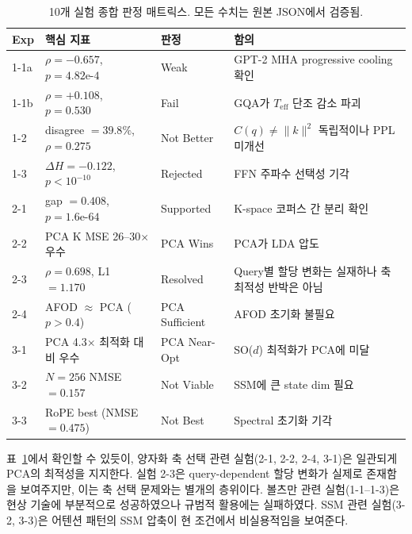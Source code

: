 \documentclass[11pt,a4paper]{article}
\newcommand{\teff}{T_\mathrm{eff}}
\newcommand{\Cq}{C(q)}
\newcommand{\knorm}{\|k\|^2}
\begin{document}
\begin{table}[H]
\centering
\caption{10개 실험 종합 판정 매트릭스. 모든 수치는 원본 JSON에서 검증됨.}
\label{tab:verdict}
\small
\begin{tabularx}{\textwidth}{@{}l>{\raggedright\arraybackslash}p{3.8cm}l>{\raggedright\arraybackslash}X@{}}
\toprule
\textbf{Exp} & \textbf{핵심 지표} & \textbf{판정} & \textbf{함의} \\
\midrule
1-1a & $\rho = -0.657$, $p = 4.82\text{e-}4$ & \textcolor{partial}{Weak} & GPT-2 MHA progressive cooling 확인 \\
1-1b & $\rho = +0.108$, $p = 0.530$ & \textcolor{failure}{Fail} & GQA가 $\teff$ 단조 감소 파괴 \\
1-2 & disagree $= 39.8\%$, $\rho = 0.275$ & \textcolor{partial}{Not Better} & $\Cq \neq \knorm$ 독립적이나 PPL 미개선 \\
1-3 & $\Delta H = -0.122$, $p < 10^{-10}$ & \textcolor{failure}{Rejected} & FFN 주파수 선택성 기각 \\
2-1 & gap $= 0.408$, $p = 1.6\text{e-}64$ & \textcolor{success}{Supported} & K-space 코퍼스 간 분리 확인 \\
2-2 & PCA K MSE 26--30$\times$ 우수 & \textcolor{success}{PCA Wins} & PCA가 LDA 압도 \\
2-3 & $\rho = 0.698$, L1 $= 1.170$ & \textcolor{success}{Resolved} & Query별 할당 변화는 실재하나 축 최적성 반박은 아님 \\
2-4 & AFOD $\approx$ PCA ($p > 0.4$) & \textcolor{success}{PCA Sufficient} & AFOD 초기화 불필요 \\
3-1 & PCA 4.3$\times$ 최적화 대비 우수 & \textcolor{success}{PCA Near-Opt} & SO($d$) 최적화가 PCA에 미달 \\
3-2 & $N{=}256$ NMSE $= 0.157$ & \textcolor{failure}{Not Viable} & SSM에 큰 state dim 필요 \\
3-3 & RoPE best (NMSE $= 0.475$) & \textcolor{failure}{Not Best} & Spectral 초기화 기각 \\
\bottomrule
\end{tabularx}
\end{table}

표~\ref{tab:verdict}에서 확인할 수 있듯이, 양자화 축 선택 관련 실험(2-1, 2-2, 2-4, 3-1)은 일관되게 PCA의 최적성을 지지한다. 실험 2-3은 query-dependent 할당 변화가 실제로 존재함을 보여주지만, 이는 축 선택 문제와는 별개의 층위이다. 볼츠만 관련 실험(1-1--1-3)은 현상 기술에 부분적으로 성공하였으나 규범적 활용에는 실패하였다. SSM 관련 실험(3-2, 3-3)은 어텐션 패턴의 SSM 압축이 현 조건에서 비실용적임을 보여준다.
\end{document}
